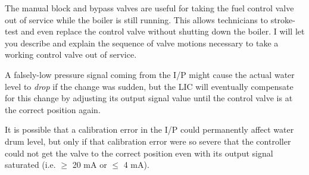 \vskip 10pt

The manual block and bypass valves are useful for taking the fuel control valve out of service while the boiler is still running.  This allows technicians to stroke-test and even replace the control valve without shutting down the boiler.  I will let you describe and explain the sequence of valve motions necessary to take a working control valve out of service.

\vskip 10pt

A falsely-low pressure signal coming from the I/P might cause the actual water level to {\it drop} if the change was sudden, but the LIC will eventually compensate for this change by adjusting its output signal value until the control valve is at the correct position again.







It is possible that a calibration error in the I/P could permanently affect water drum level, but only if that calibration error were so severe that the controller could not get the valve to the correct position even with its output signal saturated (i.e. $\geq$ 20 mA or $\leq$ 4 mA).




